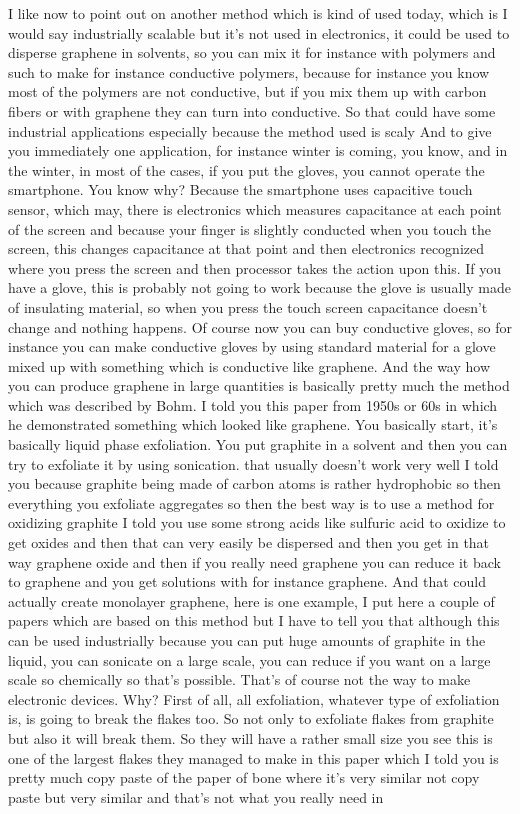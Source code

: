 I like now to point out on another method which is kind of used today, which is I would say industrially scalable but it's not used in electronics, it could be used to disperse graphene in solvents, so you can mix it for instance with polymers and such to make for instance conductive polymers, because for instance you know most of the polymers are not conductive, but if you mix them up with carbon fibers or with graphene they can turn into conductive. So that could have some industrial applications especially because the method used is scaly And to give you immediately one application, for instance winter is coming, you know, and in the winter, in most of the cases, if you put the gloves, you cannot operate the smartphone. You know why? Because the smartphone uses capacitive touch sensor, which may, there is electronics which measures capacitance at each point of the screen and because your finger is slightly conducted when you touch the screen, this changes capacitance at that point and then electronics recognized where you press the screen and then processor takes the action upon this. If you have a glove, this is probably not going to work because the glove is usually made of insulating material, so when you press the touch screen capacitance doesn't change and nothing happens. Of course now you can buy conductive gloves, so for instance you can make conductive gloves by using standard material for a glove mixed up with something which is conductive like graphene. And the way how you can produce graphene in large quantities is basically pretty much the method which was described by Bohm. I told you this paper from 1950s or 60s in which he demonstrated something which looked like graphene. You basically start, it's basically liquid phase exfoliation. You put graphite in a solvent and then you can try to exfoliate it by using sonication. that usually doesn't work very well I told you because graphite being made of carbon atoms is rather hydrophobic so then everything you exfoliate aggregates so then the best way is to use a method for oxidizing graphite I told you use some strong acids like sulfuric acid to oxidize to get oxides and then that can very easily be dispersed and then you get in that way graphene oxide and then if you really need graphene you can reduce it back to graphene and you get solutions with for instance graphene. And that could actually create monolayer graphene, here is one example, I put here a couple of papers which are based on this method but I have to tell you that although this can be used industrially because you can put huge amounts of graphite in the liquid, you can sonicate on a large scale, you can reduce if you want on a large scale so chemically so that's possible. That's of course not the way to make electronic devices. Why? First of all, all exfoliation, whatever type of exfoliation is, is going to break the flakes too. So not only to exfoliate flakes from graphite but also it will break them. So they will have a rather small size you see this is one of the largest flakes they managed to make in this paper which I told you is pretty much copy paste of the paper of bone where it's very similar not copy paste but very similar and that's not what you really need in 